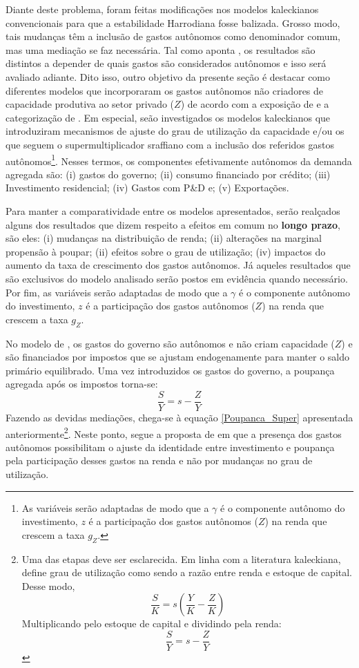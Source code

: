 Diante deste problema, foram feitas modificações nos modelos kaleckianos convencionais para que a estabilidade Harrodiana fosse balizada. Grosso modo, tais mudanças têm a inclusão de gastos autônomos como denominador comum, mas uma mediação se faz necessária. Tal como aponta \textcite[p.~3]{allain_macroeconomic_2014}, os resultados são distintos a depender de quais gastos são considerados autônomos e isso será avaliado adiante. Dito isso, outro objetivo da presente seção é destacar como diferentes modelos que incorporaram os gastos autônomos não criadores de capacidade produtiva ao setor privado ($Z$) de acordo com a exposição de \textcite{cesaratto_technical_2003} e a categorização de \textcite{serrano_sraffian_1995}. Em especial,  seão investigados os modelos kaleckianos que introduziram mecanismos de ajuste do grau de utilização da capacidade e/ou os que seguem o supermultiplicador sraffiano com a inclusão dos referidos gastos autônomos\footnote{As variáveis serão adaptadas de modo que a $\gamma$ é o componente autônomo do investimento,  $z$ é a participação dos gastos autônomos ($Z$) na renda que crescem a taxa $g_Z$.}. Nesses termos, os componentes efetivamente autônomos da demanda agregada são: (i) gastos do governo; (ii) consumo financiado por crédito; (iii) Investimento residencial; (iv) Gastos com P\&D e; (v) Exportações.

Para manter a comparatividade entre os modelos apresentados, serão realçados alguns dos resultados que dizem respeito a efeitos em comum no \textbf{longo prazo}, são eles: (i) mudanças na distribuição de renda; (ii) alterações na marginal propensão à poupar; (ii) efeitos sobre o grau de utilização; (iv) impactos do aumento da taxa de crescimento dos gastos autônomos. Já aqueles resultados que são exclusivos do modelo analisado serão postos em evidência quando necessário. Por fim, as variáveis serão adaptadas de modo que a $\gamma$ é o componente autônomo do investimento,  $z$ é a participação dos gastos autônomos ($Z$) na renda que crescem a taxa $g_Z$.

No modelo de \textcite{allain_macroeconomic_2014}, os gastos do governo são autônomos e não criam capacidade ($Z$) e são financiados por impostos que se ajustam endogenamente para manter o saldo primário equilibrado.  Uma vez introduzidos os gastos do governo, a poupança agregada após os impostos torna-se:
$$
\frac{S}{Y} = s - \frac{Z}{Y}
$$
Fazendo as devidas mediações, chega-se à equação \ref{Poupanca_Super} apresentada anteriormente\footnote{Uma das etapas deve ser esclarecida. Em linha com a literatura kaleckiana, \textcite{allain_macroeconomic_2014} define grau de utilização como sendo a razão entre renda e estoque de capital. Desse modo, 
$$
\frac{S}{K} = s\left(\frac{Y}{K} - \frac{Z}{K}\right) 
$$
Multiplicando pelo estoque de capital e dividindo pela renda:
$$
\frac{S}{Y} = s - \frac{Z}{Y}
$$}. Neste ponto, \textcite[p.~10]{allain_macroeconomic_2014} segue a proposta de \textcite{serrano_sraffian_1995} em que a presença dos gastos autônomos possibilitam o ajuste da identidade entre investimento e poupança pela participação desses gastos na renda e não por mudanças no grau de utilização. 

